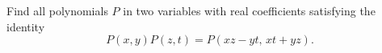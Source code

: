 Find all polynomials \(P\) in two variables with real coefficients satisfying the identity
\[
P(x,y)P(z,t) = P(xz - yt,\, xt + yz).
\]
